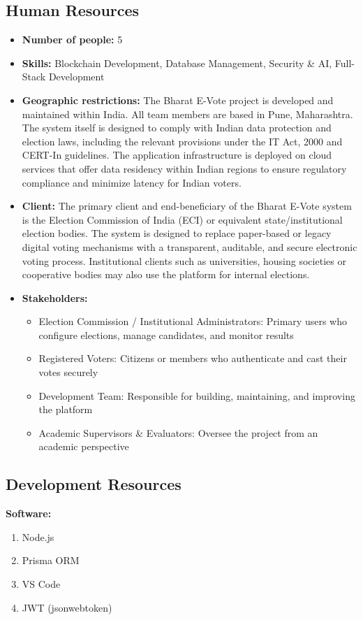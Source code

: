 \documentclass[oneside,a4paper,12pt]{book}
\begin{document}
\subsection{Human Resources}
\begin{itemize}[leftmargin=1.5cm]
    \item \textbf{Number of people:} 5
    \item \textbf{Skills:} Blockchain Development, Database Management, Security \& AI, Full-Stack Development
    \item \textbf{Geographic restrictions:} The Bharat E-Vote project is developed and maintained within India. All team members are based in Pune, Maharashtra. The system itself is designed to comply with Indian data protection and election laws, including the relevant provisions under the IT Act, 2000 and CERT-In guidelines. The application infrastructure is deployed on cloud services that offer data residency within Indian regions to ensure regulatory compliance and minimize latency for Indian voters.
    \item \textbf{Client:} The primary client and end-beneficiary of the Bharat E-Vote system is the Election Commission of India (ECI) or equivalent state/institutional election bodies. The system is designed to replace paper-based or legacy digital voting mechanisms with a transparent, auditable, and secure electronic voting process. Institutional clients such as universities, housing societies or cooperative bodies may also use the platform for internal elections.
    \item \textbf{Stakeholders:}
    \begin{itemize}
        \item Election Commission / Institutional Administrators: Primary users who configure elections, manage candidates, and monitor results
        \item Registered Voters: Citizens or members who authenticate and cast their votes securely
        \item Development Team: Responsible for building, maintaining, and improving the platform
        \item Academic Supervisors \& Evaluators: Oversee the project from an academic perspective
    \end{itemize}
\end{itemize}

\subsection{Development Resources}
\textbf{Software:}
\begin{enumerate}[leftmargin=1.5cm]
    \item Node.js
    \item Prisma ORM
    \item VS Code
    \item JWT (jsonwebtoken)
\end{enumerate}
\end{document}
